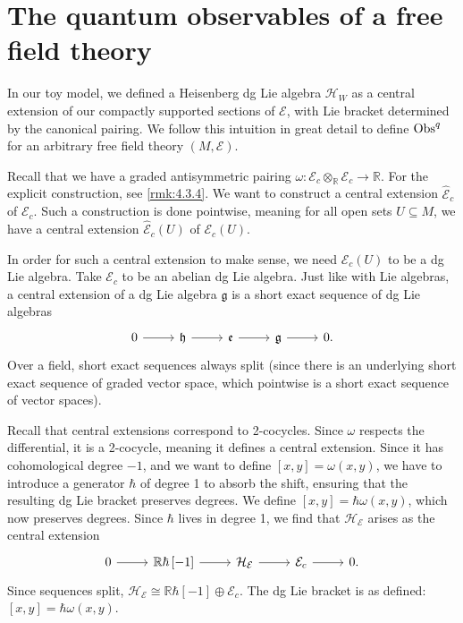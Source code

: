 \section{The quantum observables of a free field theory}

In our toy model, we defined a Heisenberg dg Lie algebra $\mathcal{H} _W$ as a central extension of our compactly supported sections of $\mathcal{E} $, with Lie bracket determined by the canonical pairing. We follow this intuition in great detail to define $\operatorname{Obs}^q$ for an arbitrary free field theory $(M,\mathcal{E} )$.


\begin{construction}\label{cst:4.6.1}
	Recall that we have a graded antisymmetric pairing $\omega  : \mathcal{E} _c\otimes _\mathbb{R} \mathcal{E} _c \to \mathbb{R} $. For the explicit construction, see \cref{rmk:4.3.4}. We want to construct a central extension $\widehat{\mathcal{E} }_c $ of $\mathcal{E} _c$. Such a construction is done pointwise, meaning for all open sets $U\subseteq M$, we have a central extension $\widehat{\mathcal{E} }_c(U) $ of $\mathcal{E} _c(U)$.

	In order for such a central extension to make sense, we need $\mathcal{E} _c(U)$ to be a dg Lie algebra. Take $\mathcal{E} _c$ to be an abelian dg Lie algebra. Just like with Lie algebras, a central extension of a dg Lie algebra $\mathfrak{g} $ is a short exact sequence of dg Lie algebras
	\[\begin{tikzcd}[row sep = 2.5em, column sep = 2.5em]
	0\ar[r]  & \mathfrak{h} \ar[r]  & \mathfrak{e} \ar[r]  & \mathfrak{g} \ar[r]  & 0.
	\end{tikzcd}\]
	Over a field, short exact sequences always split (since there is an underlying short exact sequence of graded vector space, which pointwise is a short exact sequence of vector spaces).

	Recall that central extensions correspond to 2-cocycles. Since $\omega $ respects the differential, it is a 2-cocycle, meaning it defines a central extension. Since it has cohomological degree $-1$, and we want to define $[x,y]=\omega (x,y)$, we have to introduce a generator $\hbar $ of degree 1 to absorb the shift, ensuring that the resulting dg Lie bracket preserves degrees. We define $[x,y]=\hbar \omega (x,y)$, which now preserves degrees. Since $\hbar $ lives in degree 1, we find that $\mathcal{H} _\mathcal{E} $ arises as the central extension
	\[\begin{tikzcd}[row sep = 2.5em, column sep = 2.5em]
		0\ar[r]  & \mathbb{R} \hbar \left[ -1 \right] \ar[r]  & \mathcal{H} _\mathcal{E} \ar[r]  & \mathcal{E} _c\ar[r]  & 0.
	\end{tikzcd}\]
	Since sequences split, $\mathcal{H} _\mathcal{E} \cong \mathbb{R}\hbar [-1]\oplus \mathcal{E} _c$. The dg Lie bracket is as defined: $[x,y]=\hbar \omega (x,y)$.


\end{construction}
